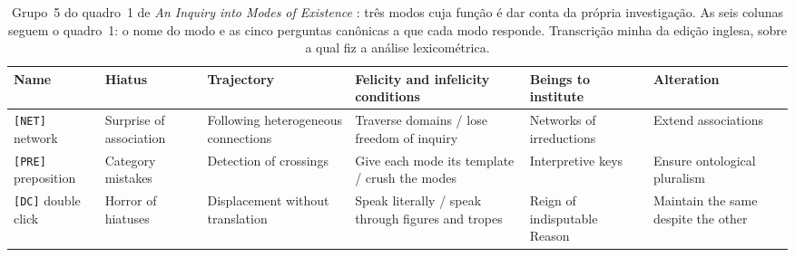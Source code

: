 \begin{table}[!htb]
\centering
\caption[Grupo 5 do quadro 1 de AIME: a metalinguagem da investigação]{Grupo~5 do quadro~1 de \emph{An Inquiry into Modes of Existence} \parencite{Latour2013Inquiry}: três modos cuja função é dar conta da própria investigação. As seis colunas seguem o quadro~1: o nome do modo e as cinco perguntas canônicas a que cada modo responde. Transcrição minha da edição inglesa, sobre a qual fiz a análise lexicométrica.}
\label{tab:aime_quadro1_grupo5}
\footnotesize
\begin{tabular}{p{1.4cm}p{1.9cm}p{2.0cm}p{2.6cm}p{1.9cm}p{2.0cm}}
\toprule
Name & Hiatus & Trajectory & Felicity and infelicity conditions & Beings to institute & Alteration \\
\midrule
\texttt{[NET]} network & Surprise of association & Following heterogeneous connections & Traverse domains / lose freedom of inquiry & Networks of irreductions & Extend associations \\
\addlinespace
\texttt{[PRE]} preposition & Category mistakes & Detection of crossings & Give each mode its template / crush the modes & Interpretive keys & Ensure ontological pluralism \\
\addlinespace
\texttt{[DC]} double click & Horror of hiatuses & Displacement without translation & Speak literally / speak through figures and tropes & Reign of indisputable Reason & Maintain the same despite the other \\
\bottomrule
\end{tabular}
\end{table}

